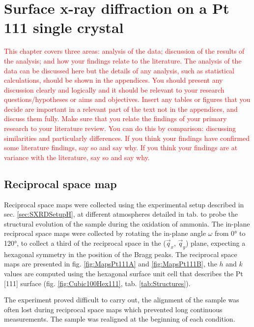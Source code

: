\section{Surface x-ray diffraction on a Pt 111 single crystal} \label{sec:SXRD111}

\textcolor{red}{This chapter covers three areas: analysis of the data; discussion of the results of the analysis; and how your findings relate to the literature. The analysis of the data can be discussed here but the details of any analysis, such as statistical calculations, should be shown in the appendices. You should present any discussion clearly and logically and it should be relevant to your research questions/hypotheses or aims and objectives. Insert any tables or figures that you decide are important in a relevant part of the text not in the appendices, and discuss them fully. Make sure that you relate the findings of your primary research to your literature review. You can do this by comparison: discussing similarities and particularly differences. If you think your findings have confirmed some literature findings, say so and say why. If you think your findings are at variance with the literature, say so and say why.}

\subsection{Reciprocal space map}

Reciprocal space maps were collected using the experimental setup described in sec. \ref{sec:SXRDSetupH}, at different atmospheres detailed in tab. to probe the structural evolution of the sample during the oxidation of ammonia.
The in-plane reciprocal space maps were collected by rotating the in-plane angle $\omega$ from \ang{0} to \ang{120}, to collect a third of the reciprocal space in the ($\vec{q}_x$, $\vec{q}_y$) plane, expecting a hexagonal symmetry in the position of the Bragg peaks.
The reciprocal space maps are presented in fig. \ref{fig:MapsPt111A} and \ref{fig:MapsPt111B}, the $h$ and $k$ values are computed using the hexagonal surface unit cell that describes the Pt [111] surface (fig. \ref{fig:Cubic100Hex111}, tab. \ref{tab:Structures}).

The experiment proved difficult to carry out, the alignment of the sample was often lost during reciprocal space maps which prevented long continuous measurements.
The sample was realigned at the beginning of each condition.

